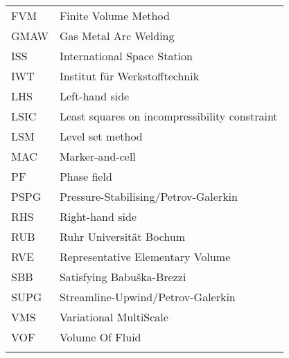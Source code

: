 {{{\begin{tabu}{p{2cm} p{12cm}}
FVM		&	Finite Volume Method			\\ 
GMAW	& 	Gas Metal Arc Welding			\\
ISS 	&	International Space Station 	\\
IWT		&	Institut für Werkstofftechnik 	\\
LHS		& 	Left-hand side					\\ 
LSIC	&	Least squares on incompressibility constraint \\
LSM		&	Level set method				\\
MAC		&	Marker-and-cell 				\\
PF		&	Phase field 					\\
PSPG	&	Pressure-Stabilising/Petrov-Galerkin \\
RHS		& 	Right-hand side					\\ 
RUB		& 	Ruhr Universität Bochum 		\\ 
RVE		&	Representative Elementary Volume\\
SBB		&	Satisfying Babuška-Brezzi 		\\
SUPG	&	Streamline-Upwind/Petrov-Galerkin \\
VMS		&	Variational MultiScale			\\
VOF		&	Volume Of Fluid					\\\tabucline[1pt]{-}
\end{tabu}}
}
}
\newlength{\largeur}
\newlength{\llargeur}
\newlength{\llargeurOut}
\newlength{\rlargeur}
\newlength{\rlargeurOut}
